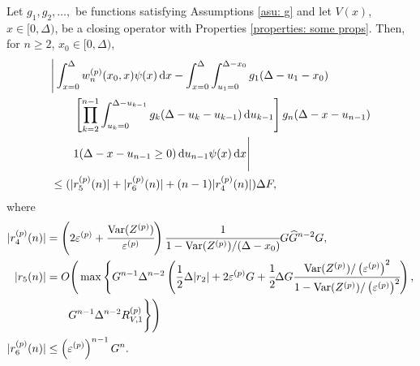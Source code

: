 \begin{cor}\label{eqn: lafkjebjcbbalbvvbrb}
	 Let \(g_1,g_2,\dots,\) be functions satisfying Assumptions \ref{asu: g} and let \(V(x)\), \(x\in[0,\Delta)\), be a closing operator with Properties \ref{properties: some props}. Then, for \(n\geq 2\), \(x_0\in[0,\Delta)\), 
	\begin{align}
		&\Bigg| \int_{x=0}^\Delta w_n^{(p)}(x_0,x) \psi(x) \, \mathrm{d} x \nonumber 
		- \int_{x=0}^\Delta \int_{u_1=0}^{\Delta-x_0}g_1(\Delta - u_1 - x_0)
		\\&\qquad{} \left[\prod_{k=2}^{n-1} \int_{u_k=0}^{\Delta-u_{k-1}} g_k(\Delta-u_k-u_{k-1})\, \mathrm{d} u_{k-1}\right] \nonumber 
	g_{n}(\Delta - x-u_{n-1}) 
		\\&\qquad{} 1(\Delta-x-u_{n-1}\geq0) \, \mathrm{d} u_{n-1}\psi(x) \, \mathrm{d} x \Bigg| \nonumber
		\\&\leq (|r_5^{(p)}(n)| + |r_6^{(p)}(n)| + (n-1)|r_4^{(p)}(n)|)\Delta F, \label{eqn: rhs gs 4dvfklsmv}
	\end{align}
	where 
	\begin{align*}
		|r_4^{(p)}(n)| &= \left(2\varepsilon^{(p)} + \cfrac{\mathrm{Var}(Z^{(p)})}{\varepsilon^{(p)}}\right) \cfrac{1}{1-\mathrm{Var}(Z^{(p)})/(\Delta-x_0)} G \widehat G^{n-2} G ,
		\\|r_5(n)|&= O\Bigg(\max\Bigg\{G^{n-1}\Delta^{n-2}\left(\frac{1}{2}\Delta|r_2 |+ 2\varepsilon^{(p)} G 
		+ \cfrac{1}{2}\Delta G\cfrac{\mathrm{Var}(Z^{(p)})/\left(\varepsilon^{(p)}\right)^2}{1-\mathrm{Var}(Z^{(p)})/\left(\varepsilon^{(p)}\right)^2}\right),
		\\&\qquad{} G^{n-1}\Delta^{n-2}R_{V,1}^{(p)}\Bigg\}\Bigg)
		\\|r_6^{(p)}(n)| &\leq\left(\varepsilon^{(p)}\right)^{n-1}G^n.
	\end{align*}
\end{cor}
